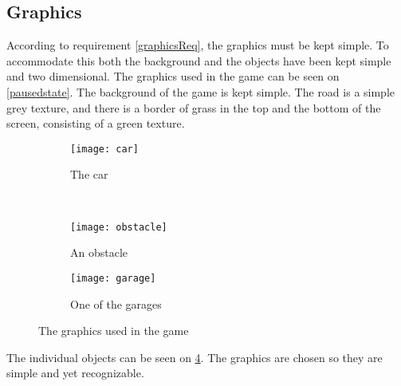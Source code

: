 \subsection{Graphics}
According to requirement \ref{graphicsReq}, the graphics must be kept simple.
To accommodate this both the background and the objects have been kept simple and two dimensional.
The graphics used in the game can be seen on \cref{pausedstate}.
The background of the game is kept simple.
The road is a simple grey texture, and there is a border of grass in the top and the bottom of the screen, consisting of a green texture.

\begin{figure}[h]
\begin{subfigure}{0.5\textwidth}
\centering
\texttt{[image: car]}
\caption{The car}
\label{car}
\end{subfigure}
~
\begin{subfigure}{0.5\textwidth}
\centering
\texttt{[image: obstacle]}
\caption{An obstacle}
\label{obstacle}
\end{subfigure}

\begin{subfigure}{\textwidth}
\centering
\texttt{[image: garage]}
\caption{One of the garages}
\label{garage}
\end{subfigure}
\caption{The graphics used in the game}
\label{graphicszoom}
\end{figure}

The individual objects can be seen on \cref{graphicszoom}.
The graphics are chosen so they are simple and yet recognizable.